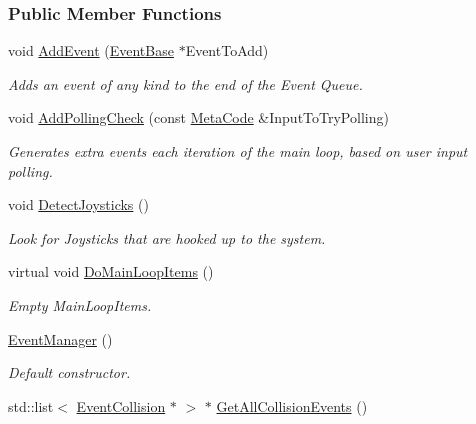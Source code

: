 \subsubsection*{Public Member Functions}
\begin{DoxyCompactItemize}
\item 
void \hyperlink{classphys_1_1EventManager_abada23d83ef38e59a38eb91a88a07404}{AddEvent} (\hyperlink{classphys_1_1EventBase}{EventBase} $\ast$EventToAdd)
\begin{DoxyCompactList}\small\item\em Adds an event of any kind to the end of the Event Queue. \item\end{DoxyCompactList}\item 
void \hyperlink{classphys_1_1EventManager_a6ff66883358344908afd11204f79f196}{AddPollingCheck} (const \hyperlink{classphys_1_1MetaCode}{MetaCode} \&InputToTryPolling)
\begin{DoxyCompactList}\small\item\em Generates extra events each iteration of the main loop, based on user input polling. \item\end{DoxyCompactList}\item 
void \hyperlink{classphys_1_1EventManager_a0b36c605c2a059c96e787ed4c1fd68bc}{DetectJoysticks} ()
\begin{DoxyCompactList}\small\item\em Look for Joysticks that are hooked up to the system. \item\end{DoxyCompactList}\item 
virtual void \hyperlink{classphys_1_1EventManager_aca8fb3d285484dcdb943824bf11f3596}{DoMainLoopItems} ()
\begin{DoxyCompactList}\small\item\em Empty MainLoopItems. \item\end{DoxyCompactList}\item 
\hyperlink{classphys_1_1EventManager_a018b36588bf2a2e90536e64be060d6fc}{EventManager} ()
\begin{DoxyCompactList}\small\item\em Default constructor. \item\end{DoxyCompactList}\item 
std::list$<$ \hyperlink{classphys_1_1EventCollision}{EventCollision} $\ast$ $>$ $\ast$ \hyperlink{classphys_1_1EventManager_a1881421e075a5965d6d5a0678f93ad9a}{GetAllCollisionEvents} ()

\end{DoxyCompactItemize}
